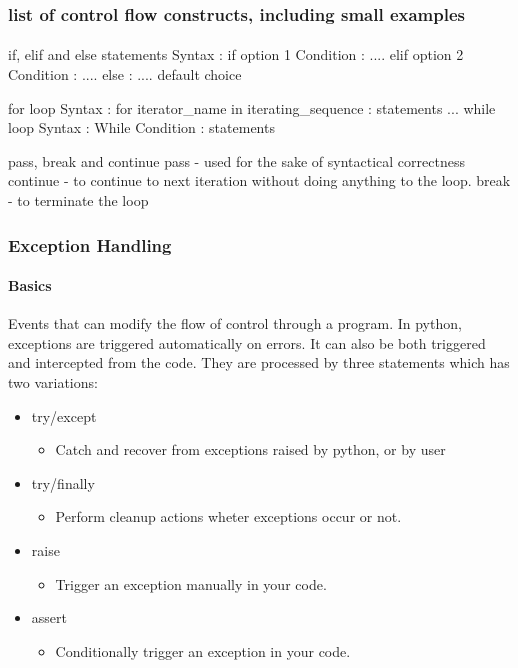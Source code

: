 \documentclass{beamer}
\begin{document}
\begin{frame}
\frametitle{list of control flow constructs, including small examples}
\framesubtitle{}

if, elif and else statements
Syntax : if option 1 Condition :
            ....
         elif option 2 Condition :
           ....
         else :
            .... default choice   

for loop
Syntax : for iterator\_name in iterating\_sequence :
               statements
               ...
while loop
Syntax : While Condition :
            statements 

pass, break and continue
pass - used for the sake of syntactical correctness
continue - to continue to next iteration without doing anything to the loop.
break - to terminate the loop
\end{frame}

\begin{frame}
\frametitle{Exception Handling}
\framesubtitle{Basics}
Events that can modify the flow of control through a program.
In python, exceptions are triggered automatically on errors. It can also be both triggered and intercepted from the code. They are processed by three statements which has two variations:
\begin{itemize}
\item try/except
	\begin{itemize}
	\item Catch and recover from exceptions raised by python, or by user
	\end{itemize}
\item try/finally
	\begin{itemize}
	\item Perform cleanup actions wheter exceptions occur or not.
	\end{itemize}
\item raise
	\begin{itemize}
	\item Trigger an exception manually in your code.
	\end{itemize}
\item assert
	\begin{itemize}
	\item Conditionally trigger an exception in your code.
	\end{itemize}
\end{itemize}
  
\end{frame}


%         
\end{document}
